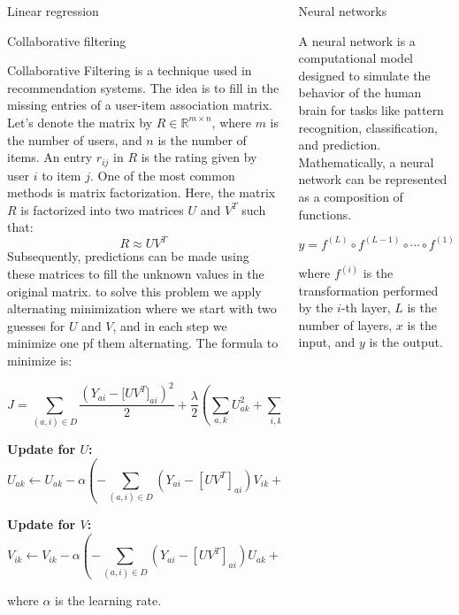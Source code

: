\documentclass{beamer}
\begin{document}
\begin{frame}
\begin{columns}
\begin{column}{0.3\textwidth}
\begin{block}{Linear regression}
\end{block}

\begin{block}{Collaborative filtering}

Collaborative Filtering is a technique used in recommendation systems. The idea is to fill in the missing entries of a user-item association matrix. Let's denote the matrix by $R \in \mathbb{R}^{m \times n}$, where $m$ is the number of users, and $n$ is the number of items. An entry $r_{ij}$ in $R$ is the rating given by user $i$ to item $j$. One of the most common methods is matrix factorization. Here, the matrix $R$ is factorized into two matrices $U$ and $V^T$ such that:
\[
R \approx U V^T
\]
Subsequently, predictions can be made using these matrices to fill the unknown values in the original matrix. to solve this problem we apply alternating minimization where we start with two guesses for $U$ and $V$, and in each step we minimize one pf them alternating. The formula to minimize is: 

\[
J = \sum _{(a,i) \in D} \frac{(Y_{ai} - \big [UV^ T\big ]_{ai})^2}{2} + \frac{\lambda }{2} \left(\sum _{a,k} U_{ak}^2 + \sum _{i,k} V_{ik}^2\right).
\]

\textbf{Update for \( U \):}
\[
U_{ak} \leftarrow U_{ak} - \alpha \left( -\sum_{(a,i) \in D} (Y_{ai} - [UV^T]_{ai}) V_{ik} + \lambda \sum _{a,k} U_{ak} \right)
\]

\textbf{Update for \( V \):}
\[
V_{ik} \leftarrow V_{ik} - \alpha \left( -\sum_{(a,i) \in D} (Y_{ai} - [UV^T]_{ai}) U_{ak} + \lambda \sum_{i,k}  V_{ik} \right)
\]

where \( \alpha \) is the learning rate.
\end{block}

\end{column}

\begin{column}{0.3\textwidth}

\begin{block}{Neural networks}

A neural network is a computational model designed to simulate the behavior of the human brain for tasks like pattern recognition, classification, and prediction. Mathematically, a neural network can be represented as a composition of functions.

\[
y = f^{(L)} \circ f^{(L-1)} \circ \cdots \circ f^{(1)}(x)
\]

where \( f^{(i)} \) is the transformation performed by the \( i \)-th layer, \( L \) is the number of layers, \( x \) is the input, and \( y \) is the output.


\end{block}
\end{column}
\end{columns}
\end{frame}
\end{document}
